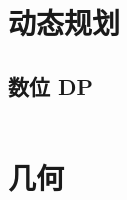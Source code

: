 \documentclass[a4paper, twoside]{article}
\begin{document}
\begin{multicols}{2}
		\newpage
		\section{动态规划}
			\subsection{数位 DP}
				\inputminted{cpp}{../src-midori/dp/数位dp.cpp}
		
		\newpage
		\section{几何}
			\inputminted{cpp}{../src-midori/geometry/geo-jry.cpp}
		
		
	\end{multicols}

	
\end{document}
